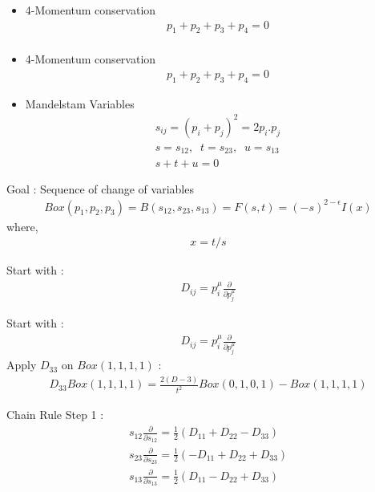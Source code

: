 \documentclass[11pt]{beamer}
\begin{document}
\begin{frame}
	\begin{itemize}
		\item 4-Momentum conservation
	\begin{align*}
		p_1+p_2+p_3+p_4=0\\
	\end{align*}
\end{itemize}
\end{frame}
\begin{frame}
	\begin{itemize}
		\item 4-Momentum conservation
		\begin{align*}
			p_1+p_2+p_3+p_4=0
		\end{align*}
	\item Mandelstam Variables
	\begin{align*}
		s_{ij}=(p_i+p_j)^2=2p_i.p_j\\
		s=s_{12},\;\; t=s_{23},\;\; u=s_{13}\\
		s+t+u=0
	\end{align*}
	\end{itemize}
\end{frame}
\begin{frame}
	Goal : Sequence of change of variables
	\begin{align*}
		Box(p_1,p_2,p_3)=B(s_{12},s_{23},s_{13})=F(s,t)=(-s)^{2-\epsilon}I(x)
	\end{align*}
where,
\begin{align*}
	x=t/s
\end{align*}
\end{frame}
\begin{frame}
	Start with : 
	\begin{align*}
		D_{ij}=p_i^\mu\frac{\partial}{\partial p_j^\mu}
	\end{align*}
\end{frame}
\begin{frame}
	Start with : 
	\begin{align*}
		D_{ij}=p_i^\mu\frac{\partial}{\partial p_j^\mu}
	\end{align*}
Apply $D_{33}$ on $Box(1,1,1,1)$ :
\begin{align*}
	D_{33}Box(1,1,1,1)=\frac{2(D-3)}{t^2}Box(0,1,0,1)-Box(1,1,1,1)
\end{align*}
\end{frame}
\begin{frame}
	Chain Rule Step 1 : 
	\begin{align*}
		s_{12}\frac{\partial}{\partial s_{12}}=\frac{1}{2}(D_{11}+D_{22}-D_{33})\\
		s_{23}\frac{\partial}{\partial s_{23}}=\frac{1}{2}(-D_{11}+D_{22}+D_{33})\\
		s_{13}\frac{\partial}{\partial s_{13}}=\frac{1}{2}(D_{11}-D_{22}+D_{33})
	\end{align*}
\end{frame}
\end{document}
